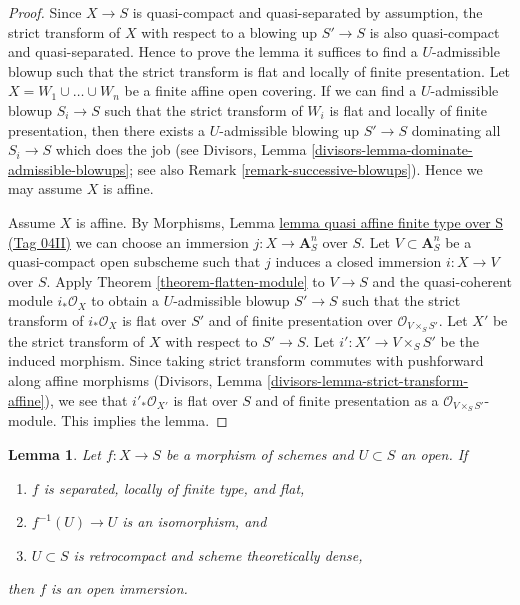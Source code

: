 \documentclass{amsart}
\theoremstyle{plain}
\newtheorem{lemma}[subsection]{Lemma}
\theoremstyle{definition}
\theoremstyle{remark}
\numberwithin{equation}{subsection}
\begin{document}
\begin{proof}
Since $X \to S$ is quasi-compact and quasi-separated by assumption,
the strict transform of $X$ with respect to a blowing up $S' \to S$
is also quasi-compact and quasi-separated. Hence to prove the lemma
it suffices to find a $U$-admissible blowup such that the strict
transform is flat and locally of finite presentation.
Let $X = W_1 \cup \ldots \cup W_n$ be a finite affine open covering.
If we can find a $U$-admissible blowup $S_i \to S$ such that the
strict transform of $W_i$ is flat and locally of finite presentation,
then there exists a $U$-admissible blowing up $S' \to S$ dominating
all $S_i \to S$ which does the job (see
Divisors, Lemma \ref{divisors-lemma-dominate-admissible-blowups};
see also Remark \ref{remark-successive-blowups}).
Hence we may assume $X$ is affine.

\medskip\noindent
Assume $X$ is affine. By
Morphisms, Lemma \href{https://stacks.math.columbia.edu/tag/04II}{lemma quasi affine finite type over S (Tag 04II)}
we can choose an immersion $j : X \to \mathbf{A}^n_S$ over $S$.
Let $V \subset \mathbf{A}^n_S$ be a quasi-compact open subscheme
such that $j$ induces a closed immersion $i : X \to V$ over $S$. Apply
Theorem \ref{theorem-flatten-module}
to $V \to S$ and the quasi-coherent module $i_*\mathcal{O}_X$
to obtain a $U$-admissible blowup $S' \to S$ such that the strict
transform of $i_*\mathcal{O}_X$ is flat over $S'$ and of finite presentation
over $\mathcal{O}_{V \times_S S'}$. Let $X'$ be the strict transform
of $X$ with respect to $S' \to S$. Let $i' : X' \to V \times_S S'$
be the induced morphism.
Since taking strict transform commutes with pushforward along affine
morphisms (Divisors, Lemma \ref{divisors-lemma-strict-transform-affine}),
we see that $i'_*\mathcal{O}_{X'}$ is flat over $S$ and of
finite presentation as a $\mathcal{O}_{V \times_S S'}$-module.
This implies the lemma.
\end{proof}


\begin{lemma}
\label{lemma-zariski}
Let $f : X \to S$ be a morphism of schemes and $U \subset S$ an open. If
\begin{enumerate}
\item $f$ is separated, locally of finite type, and flat,
\item $f^{-1}(U) \to U$ is an isomorphism, and
\item $U \subset S$ is retrocompact and scheme theoretically dense,
\end{enumerate}
then $f$ is an open immersion.
\end{lemma}
\end{document}
